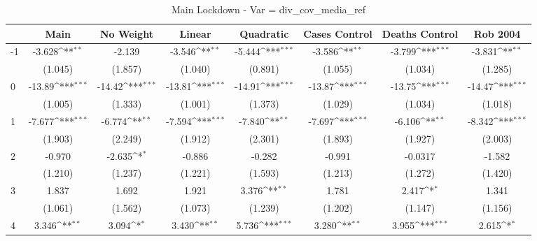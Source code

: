 \documentclass{article}
\begin{document}
{
\def\sym#1{\ifmmode^{#1}\else\(^{#1}\)\fi}
\begin{longtable}{l*{7}{c}}
\caption{Main Lockdown - Var = div\_cov\_media\_ref}\\
\hline\hline\endfirsthead\hline\endhead\hline\endfoot\endlastfoot
                &\multicolumn{1}{c}{Main}&\multicolumn{1}{c}{No Weight}&\multicolumn{1}{c}{Linear}&\multicolumn{1}{c}{Quadratic}&\multicolumn{1}{c}{Cases Control}&\multicolumn{1}{c}{Deaths Control}&\multicolumn{1}{c}{Rob 2004}\\
\hline
-1              &   -3.628\sym{**} &   -2.139         &   -3.546\sym{**} &   -5.444\sym{***}&   -3.586\sym{**} &   -3.799\sym{***}&   -3.831\sym{**} \\
                &  (1.045)         &  (1.857)         &  (1.040)         &  (0.891)         &  (1.055)         &  (1.034)         &  (1.285)         \\
0               &   -13.89\sym{***}&   -14.42\sym{***}&   -13.81\sym{***}&   -14.91\sym{***}&   -13.87\sym{***}&   -13.75\sym{***}&   -14.47\sym{***}\\
                &  (1.005)         &  (1.333)         &  (1.001)         &  (1.373)         &  (1.029)         &  (1.034)         &  (1.018)         \\
1               &   -7.677\sym{***}&   -6.774\sym{**} &   -7.594\sym{***}&   -7.840\sym{**} &   -7.697\sym{***}&   -6.106\sym{**} &   -8.342\sym{***}\\
                &  (1.903)         &  (2.249)         &  (1.912)         &  (2.301)         &  (1.893)         &  (1.927)         &  (2.003)         \\
2               &   -0.970         &   -2.635\sym{*}  &   -0.886         &   -0.282         &   -0.991         &  -0.0317         &   -1.582         \\
                &  (1.210)         &  (1.237)         &  (1.221)         &  (1.593)         &  (1.213)         &  (1.272)         &  (1.420)         \\
3               &    1.837         &    1.692         &    1.921         &    3.376\sym{**} &    1.781         &    2.417\sym{*}  &    1.341         \\
                &  (1.061)         &  (1.562)         &  (1.073)         &  (1.239)         &  (1.202)         &  (1.147)         &  (1.156)         \\
4               &    3.346\sym{**} &    3.094\sym{*}  &    3.430\sym{**} &    5.736\sym{***}&    3.280\sym{**} &    3.955\sym{***}&    2.615\sym{*}  \\

\end{longtable}}
\end{document}

